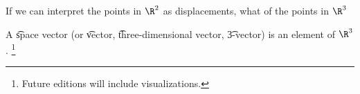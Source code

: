 
If we can interpret the points in $\R^2$ as displacements, what of the points in $\R^3$

A \t{space vector} (or \t{vector}, \t{three-dimensional vector}, \t{3-vector}) is an element of $\R^3$.
  \ifhmode\unskip\fi\footnote{
Future editions will include visualizations.
  }

\blankpage
